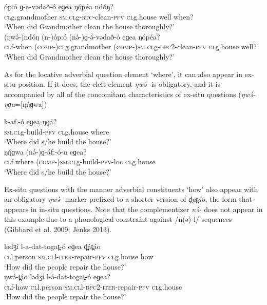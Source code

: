 \ea
\ea
\gll	ópːó	ɡ-a-vədað-ó	eɡea        ŋópéa   ndóŋ?\\
	\textsc{cl}g.grandmother	\textsc{sm.cl}g-\textsc{rtc}-clean-\textsc{pfv}	\textsc{cl}g.house	well	when?\\
\trans		‘When did Grandmother clean the house thoroughly?’\\
\ex
\gll	(ŋwə́-)ndóŋ	(n-)ópːó	(nə́-)ɡ-ə́-vədað-ó eɡea	ŋópéa?  \\               
	\textsc{cl}f-when	(\textsc{comp-})\textsc{cl}g.grandmother	(\textsc{comp-})\textsc{sm.cl}g-\textsc{dpc}2-clean-\textsc{pfv} 
\textsc{cl}g.house	well?\\
\trans		‘When did Grandmother clean the house thoroughly?’\\
\z
\z

As for the locative adverbial question element ‘where’, it can also appear in ex-situ position. If it does, the cleft element \textit{ŋwə́-} is obligatory, and it is accompanied by all of the concomitant characteristics of ex-situ questions (\textit{ŋwə́-ŋɡa}=[ŋŋ́ɡwa])       

\ea
\ea \gll	k-afː-ó	eɡea	ŋɡá?\\
		\textsc{sm.cl}g-build-\textsc{pfv}	\textsc{cl}g.house	where\\
\trans		‘Where did s/he build the house?’\\
\ex \gll	ŋŋ́ɡwa	(nə́-)ɡ-áfː-ó-u	eɡea?\\
		\textsc{cl}f.where	(\textsc{comp-})\textsc{sm.cl}g-build-\textsc{pfv}-loc	\textsc{cl}g.house\\
\trans		‘Where did s/he build the house?’\\
\z
\z

Ex-situ questions with the manner adverbial constituents ‘how’ also appear with an obligatory \textit{ŋwə́-} marker prefixed to a shorter version of \textit{d̪at̪áo}, the form that appears in in-situ questions. Note that the complementizer \textit{nə́-} does not appear in this example due to a phonological constraint against /n(ə)-l/ sequences (Gibbard et al. 2009; Jenks 2013). 

\ea
\ea \gll		lədʒí	l-a-dat-togat̪-ó	eɡea	d̪át̪áo  \\
	\textsc{cl}l.person	\textsc{sm.cl}l-\textsc{iter}-repair-\textsc{pfv}	\textsc{cl}g.house	how  \\
\trans	‘How did the people repair the house?’\\
\ex \gll	 ŋwə́-t̪áo	lədʒí	l-ə́-dat-togat̪-ó	eɡea?\\
	\textsc{cl}f-how	\textsc{cl}l.person	\textsc{sm.cl}l-\textsc{dpc}2-\textsc{iter}-repair-\textsc{pfv}	\textsc{cl}g.house\\
\trans	‘How did the people repair the house?’\\
\z
\z

